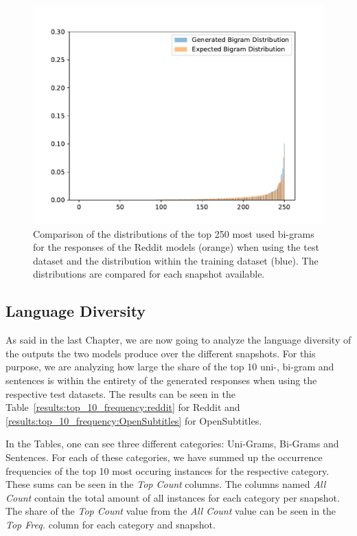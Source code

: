 \begin{figure}[H]
	\centering
	\small
	\endminipage\hfill
	\includegraphics[width=\linewidth]{img/plots/reddit/bigram_distribution_comparison_step_3000000.pdf}
	\centering
	\small
	\endminipage\hfill
	\caption{Comparison of the distributions of the top 250 most used bi-grams for the responses of the Reddit models (orange) when using the test dataset and the distribution within the training dataset (blue). The distributions are compared for each snapshot available.}
	\label{results:bigram:distributions:reddit}
\end{figure}

\subsection{Language Diversity}
As said in the last Chapter, we are now going to analyze the language diversity of the outputs the two models produce over the different snapshots. For this purpose, we are analyzing how large the share of the top 10 uni-, bi-gram and sentences is within the entirety of the generated responses when using the respective test datasets. The results can be seen in the Table~\ref{results:top_10_frequency:reddit} for Reddit and \ref{results:top_10_frequency:OpenSubtitles} for OpenSubtitles. 

In the Tables, one can see three different categories: Uni-Grams, Bi-Grams and Sentences. For each of these categories, we have summed up the occurrence frequencies of the top 10 most occuring instances for the respective category. These sums can be seen in the \emph{Top Count} columns. The columns named \emph{All Count} contain the total amount of all instances for each category per snapshot. The share of the \emph{Top Count} value from the \emph{All Count} value can be seen in the \emph{Top Freq.} column for each category and snapshot.

